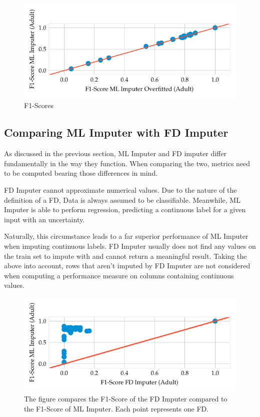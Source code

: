 \begin{figure}[ht]
     \centering
     \includegraphics[width=\textwidth]{../figures/adult/f1_ml_overfit.pdf}
     \caption{F1-Scores}
     \label{fig:f1-ml-overfit-adult}
 \end{figure}


\subsection{Comparing ML Imputer with FD Imputer}
As discussed in the previous section, ML Imputer and FD imputer differ fundamentally in the way they function.
When comparing the two, metrics need to be computed bearing those differences in mind.

FD Imputer cannot approximate numerical values.
Due to the nature of the definition of a FD, Data is always assumed to be classifiable.
Meanwhile, ML Imputer is able to perform regression, predicting a continuous label for a given input with an uncertainty.

Naturally, this circumstance leads to a far superior performance of ML Imputer when imputing continuous labels.
FD Imputer usually does not find any values on the train set to impute with and cannot return a meaningful result.
Taking the above into account, rows that aren't imputed by FD Imputer are not considered when computing a performance measure on columns containing continuous values.

\begin{figure}[ht]
     \centering
     \includegraphics[width=\textwidth]{../figures/adult/f1_ml_fd}
     \caption{The figure compares the F1-Score of the FD Imputer compared to the F1-Score of ML Imputer. Each point represents one FD.}
     \label{fig:f1_ml_fd_adult}
 \end{figure}

